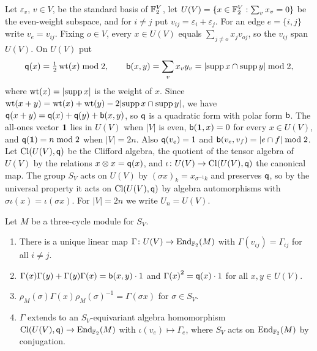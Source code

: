 Let $\varepsilon_v$, $v\in V$, be the standard basis of $\mathbb{F}_2^V$, let $U(V)=\{x\in\mathbb{F}_2^V:\sum_v x_v=0\}$ be the even-weight subspace, and for $i\ne j$ put $v_{ij}=\varepsilon_i+\varepsilon_j$. For an edge $e=\{i,j\}$ write $v_e=v_{ij}$. Fixing $o\in V$, every $x\in U(V)$ equals $\sum_{j\ne o}x_j v_{oj}$, so the $v_{ij}$ span $U(V)$. On $U(V)$ put
\[
\mathsf{q}(x)=\tfrac12\operatorname{wt}(x)\bmod 2,\qquad \mathsf{b}(x,y)=\sum_v x_{v}y_v=\lvert\operatorname{supp} x\cap\operatorname{supp} y\rvert\bmod2 ,
\]
where $\operatorname{wt}(x)=\lvert\operatorname{supp} x\rvert$ is the weight of $x$. Since $\operatorname{wt}(x+y)=\operatorname{wt}(x)+\operatorname{wt}(y)-2\lvert\operatorname{supp} x\cap\operatorname{supp} y\rvert$, we have $\mathsf{q}(x+y)=\mathsf{q}(x)+\mathsf{q}(y)+\mathsf{b}(x,y)$, so $\mathsf{q}$ is a quadratic form with polar form $\mathsf{b}$. The all-ones vector $\mathbf{1}$ lies in $U(V)$ when $|V|$ is even, $\mathsf{b}(\mathbf{1},x)=0$ for every $x\in U(V)$, and $\mathsf{q}(\mathbf{1})=n\bmod 2$ when $|V|=2n$. Also $\mathsf{q}(v_e)=1$ and $\mathsf{b}(v_e,v_f)=|e\cap f|\bmod 2$. Let $\operatorname{Cl}(U(V),\mathsf{q})$ be the Clifford algebra, the quotient of the tensor algebra of $U(V)$ by the relations $x\otimes x=\mathsf{q}(x)$, and $\iota\colon U(V)\to\operatorname{Cl}(U(V),\mathsf{q})$ the canonical map. The group $S_V$ acts on $U(V)$ by ${(\sigma x)}_k=x_{\sigma^{-1}k}$ and preserves $\mathsf{q}$, so by the universal property it acts on $\operatorname{Cl}(U(V),\mathsf{q})$ by algebra automorphisms with $\sigma\iota(x)=\iota(\sigma x)$. For $|V|=2n$ we write $U_n=U(V)$.

\begin{theorem}\label{thm:clifford}
Let $M$ be a three-cycle module for $S_V$.
\begin{enumerate}
\item There is a unique linear map $\Gamma\colon U(V)\to\operatorname{End}_{\mathbb{F}_2}(M)$ with $\Gamma(v_{ij})=\Gamma_{ij}$ for all $i\ne j$.
\item $\Gamma(x)\Gamma(y)+\Gamma(y)\Gamma(x)=\mathsf{b}(x,y)\cdot 1$ and ${\Gamma(x)}^2=\mathsf{q}(x)\cdot 1$ for all $x,y\in U(V)$.
\item $\rho_M(\sigma)\Gamma(x){\rho_M(\sigma)}^{-1}=\Gamma(\sigma x)$ for $\sigma\in S_V$.
\item $\Gamma$ extends to an $S_V$-equivariant algebra homomorphism $\operatorname{Cl}(U(V),\mathsf{q})\to\operatorname{End}_{\mathbb{F}_2}(M)$ with $\iota(v_e)\mapsto\Gamma_e$, where $S_V$ acts on $\operatorname{End}_{\mathbb{F}_2}(M)$ by conjugation.
\end{enumerate}
\end{theorem}

